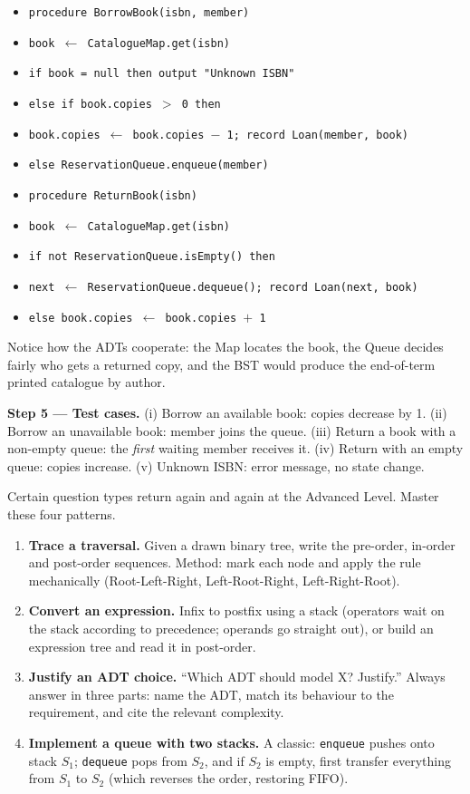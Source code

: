 \documentclass[11pt]{article}
\newcounter{popsec}
\newcounter{popsub}
\newcommand{\courssub}[1]{%
  \stepcounter{popsub}%
  \par\vspace{9pt}\noindent{\popxbold\fontsize{11.5}{13}\selectfont\color{popink}{\color{poporange}\thepopsec.\thepopsub}\hspace{6pt}#1}\par\nopagebreak\vspace{4pt}
}
\begin{document}
\begin{itemize}
\item \texttt{procedure BorrowBook(isbn, member)}
\item \texttt{\quad book $\leftarrow$ CatalogueMap.get(isbn)}
\item \texttt{\quad if book = null then output "Unknown ISBN"}
\item \texttt{\quad else if book.copies $>$ 0 then}
\item \texttt{\quad\quad book.copies $\leftarrow$ book.copies $-$ 1; record Loan(member, book)}
\item \texttt{\quad else ReservationQueue.enqueue(member)}
\item \texttt{procedure ReturnBook(isbn)}
\item \texttt{\quad book $\leftarrow$ CatalogueMap.get(isbn)}
\item \texttt{\quad if not ReservationQueue.isEmpty() then}
\item \texttt{\quad\quad next $\leftarrow$ ReservationQueue.dequeue(); record Loan(next, book)}
\item \texttt{\quad else book.copies $\leftarrow$ book.copies $+$ 1}
\end{itemize}

Notice how the ADTs cooperate: the Map locates the book, the Queue decides fairly who gets a returned copy, and the BST would produce the end-of-term printed catalogue by author.

\textbf{Step 5 --- Test cases.} (i) Borrow an available book: copies decrease by 1. (ii) Borrow an unavailable book: member joins the queue. (iii) Return a book with a non-empty queue: the \emph{first} waiting member receives it. (iv) Return with an empty queue: copies increase. (v) Unknown ISBN: error message, no state change.

\courssub{Common GCE-Style Questions}

Certain question types return again and again at the Advanced Level. Master these four patterns.

\begin{enumerate}
\item \textbf{Trace a traversal.} Given a drawn binary tree, write the pre-order, in-order and post-order sequences. Method: mark each node and apply the rule mechanically (Root-Left-Right, Left-Root-Right, Left-Right-Root).
\item \textbf{Convert an expression.} Infix to postfix using a stack (operators wait on the stack according to precedence; operands go straight out), or build an expression tree and read it in post-order.
\item \textbf{Justify an ADT choice.} ``Which ADT should model X? Justify.'' Always answer in three parts: name the ADT, match its behaviour to the requirement, and cite the relevant complexity.
\item \textbf{Implement a queue with two stacks.} A classic: \texttt{enqueue} pushes onto stack $S_1$; \texttt{dequeue} pops from $S_2$, and if $S_2$ is empty, first transfer everything from $S_1$ to $S_2$ (which reverses the order, restoring FIFO).
\end{enumerate}
\end{document}
